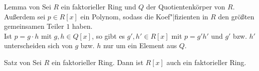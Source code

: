 \begin{Lemma}{Lemma von }
    Sei $R$ ein faktorieller Ring und $Q$ der Quotientenkörper von $R$.
    Außerdem sei $p \in R[x]$ ein Polynom, sodass die Koef"|fizienten in $R$
    den größten gemeinsamen Teiler $1$ haben. \\
    Ist $p = g \cdot h$ mit $g, h \in Q[x]$, so gibt es $g', h' \in R[x]$ mit
    $p = g'h'$ und $g'$ bzw. $h'$ unterscheiden sich von $g$ bzw. $h$ nur um
    ein Element aus $Q$.
\end{Lemma}

\begin{Satz}{Satz von }
    Sei $R$ ein faktorieller Ring.
    Dann ist $R[x]$ auch ein faktorieller Ring.
\end{Satz}

\pagebreak
